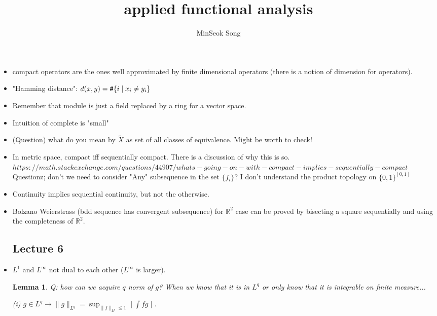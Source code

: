 \documentclass{article}
\title{applied functional analysis}
\author{MinSeok Song}
\date{}
\newtheorem{lemma}[theorem]{Lemma}
\theoremstyle{remark}
\begin{document}
\maketitle 
\begin{itemize}
\item compact operators are the ones well approximated by finite dimensional operators (there is a notion of dimension for operators).
\item "Hamming distance": $d(x,y)=\verb|#|\{i\mid x_i\neq y_i\}$

\item Remember that module is just a field replaced by a ring for a vector space.
\item Intuition of complete is "small"
\item (Question) what do you mean by $\tilde X$ as set of all classes of equivalence. Might be worth to check!
\item In metric space, compact iff sequentially compact.
There is a discussion of why this is so. $https://math.stackexchange.com/questions/44907/whats-going-on-with-compact-implies-sequentially-compact$ Questionz; don't we need to consider "Any" subsequence in the set $\{f_i\}$? I don't understand the product topology on $\{0,1\}^{[0,1]}$
\item Continuity implies sequential continuity, but not the otherwise. 
\item Bolzano Weierstrass (bdd sequence has convergent subsequence) for $\mathbb{R}^2$ case can be proved by bisecting a square sequentially and using the completeness of $\mathbb{R}^2$.

\subsection*{Lecture 6}
\item $L^1$ and $L^\infty$ not dual to each other ($L^\infty$ is larger).

\begin{lemma}
Q: how can we acquire $q$ norm of $g$? When we know that it is in $L^q$ or only know that it is integrable on finite measure...

(i) $g\in L^q\to \lVert g\rVert_{L^q}=\sup_{\lVert f\rVert_{L^p}\leq 1}\mid \int fg\mid$.


\end{lemma}
\end{itemize}
\end{document}
